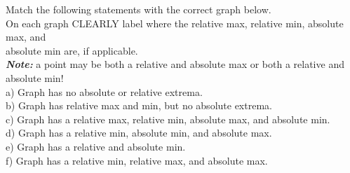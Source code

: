 \documentclass[11pt]{report}
\newlength\tindent
\renewcommand{\indent}{\hspace*{\tindent}}
\begin{document}
\newpage

Match the following statements with the correct graph below. \\
\indent On each graph CLEARLY label where the relative max, relative min, absolute max, and\\ \indent absolute min are, if applicable.\\
\indent \indent \textit{\textbf{Note:}} a point may be both a relative and absolute max or both a relative and absolute min!\\
\indent\indent\indent a) Graph has no absolute or relative extrema.\\
\indent\indent\indent b) Graph has relative max and min, but no absolute extrema.\\
\indent\indent\indent c) Graph has a relative max, relative min, absolute max, and absolute min.\\
\indent\indent\indent d) Graph has a relative min, absolute min, and absolute max.\\
\indent\indent\indent e) Graph has a relative and absolute min.\\ 
\indent\indent\indent f) Graph has a relative min, relative max, and absolute max.\\
\end{document}

